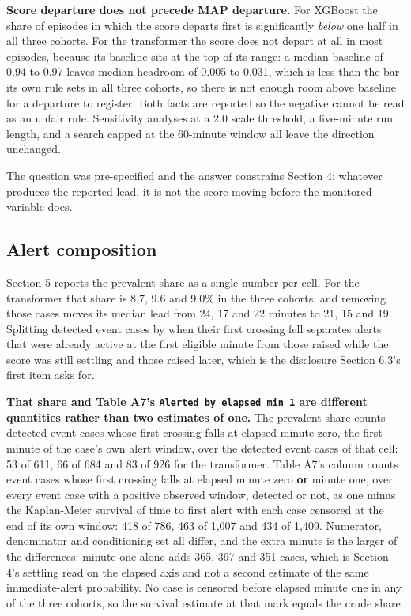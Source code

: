 \textbf{Score departure does not precede MAP departure.} For XGBoost the share of episodes in
which the score departs first is significantly \emph{below} one half in all three cohorts. For the
transformer the score does not depart at all in most episodes, because its baseline sits at the
top of its range: a median baseline of 0.94 to 0.97 leaves median headroom of 0.005 to 0.031,
which is less than the bar its own rule sets in all three cohorts, so there is not enough room
above baseline for a departure to register.
Both facts are reported so the negative cannot be read as an unfair rule. Sensitivity
analyses at a 2.0 scale threshold, a five-minute run length, and a search capped at the
60-minute window all leave the direction unchanged.

The question was pre-specified and the answer constrains Section 4: whatever produces the
reported lead, it is not the score moving before the monitored variable does.

\subsection{Alert composition}\label{alert-composition}

Section 5 reports the prevalent share as a single number per cell. For the transformer that
share is 8.7, 9.6 and 9.0\% in the three cohorts, and removing those cases moves its median lead
from 24, 17 and 22 minutes to 21, 15 and 19. Splitting detected event cases by when their first
crossing fell separates alerts that were already active at the first eligible minute from those
raised while the score was still settling and those raised later, which is the disclosure
Section 6.3's first item asks for.

\textbf{That share and Table A7's \texttt{Alerted\ by\ elapsed\ min\ 1} are different quantities rather than two
estimates of one.} The prevalent share counts detected event cases whose first crossing falls at
elapsed minute zero, the first minute of the case's own alert window, over the detected event
cases of that cell: 53 of 611, 66 of 684 and 83 of 926 for the transformer. Table A7's column
counts event cases whose first crossing falls at elapsed minute zero \textbf{or} minute one, over
every event case with a positive observed window, detected or not, as one minus the Kaplan-Meier
survival of time to first alert with each case censored at the end of its own window: 418 of 786,
463 of 1,007 and 434 of 1,409. Numerator, denominator and conditioning set all differ, and the
extra minute is the larger of the differences: minute one alone adds 365, 397 and 351 cases,
which is Section 4's settling read on the elapsed axis and not a second estimate of the same
immediate-alert probability. No case is censored before elapsed minute one in any of the three
cohorts, so the survival estimate at that mark equals the crude share.

